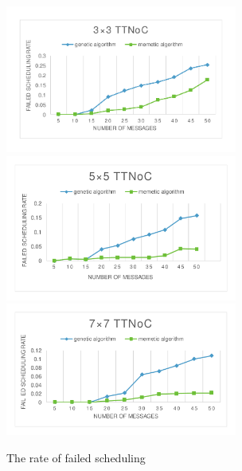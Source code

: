 \documentclass[journal]{IEEEtran}
\theoremstyle{remark}
\begin{document}
\begin{figure}[!t]
	\centering
	\includegraphics[width=3in]{picture/33TTNOC}
		\includegraphics[width=3in]{picture/55TTNOC}
			\includegraphics[width=3in]{picture/77TTNOC}
	\caption{The rate of failed scheduling}
	\label{f:fail}
\end{figure}
\end{document}
